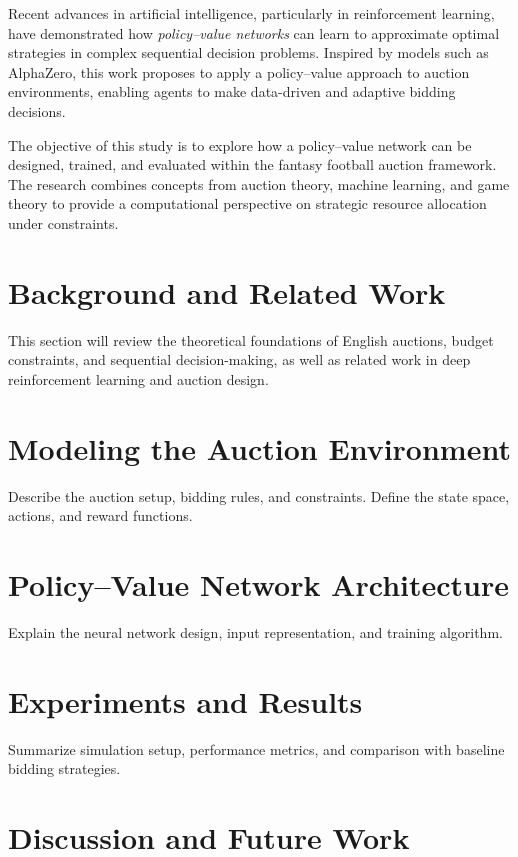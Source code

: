 \documentclass[12pt]{article}
\begin{document}
Recent advances in artificial intelligence, particularly in reinforcement learning, have demonstrated how \textit{policy--value networks} can learn to approximate optimal strategies in complex sequential decision problems. 
Inspired by models such as AlphaZero, this work proposes to apply a policy--value approach to auction environments, enabling agents to make data-driven and adaptive bidding decisions.

The objective of this study is to explore how a policy--value network can be designed, trained, and evaluated within the fantasy football auction framework. 
The research combines concepts from auction theory, machine learning, and game theory to provide a computational perspective on strategic resource allocation under constraints.

\section{Background and Related Work}

This section will review the theoretical foundations of English auctions, budget constraints, and sequential decision-making, as well as related work in deep reinforcement learning and auction design.

\section{Modeling the Auction Environment}

Describe the auction setup, bidding rules, and constraints. Define the state space, actions, and reward functions.

\section{Policy--Value Network Architecture}

Explain the neural network design, input representation, and training algorithm.

\section{Experiments and Results}

Summarize simulation setup, performance metrics, and comparison with baseline bidding strategies.

\section{Discussion and Future Work}
\end{document}
